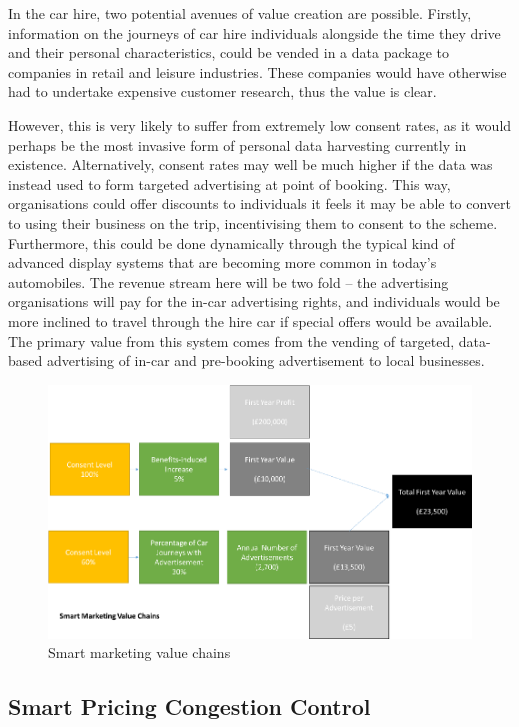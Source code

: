 \documentclass[conference]{IEEEtran}
\begin{document}
In the car hire, two potential avenues of value creation are possible.
Firstly, information on the journeys of car hire individuals alongside
the time they drive and their personal characteristics, could be
vended in a data package to companies in retail and leisure
industries. These companies would have otherwise had to undertake
expensive customer research, thus the value is clear.

However, this is very likely to suffer from extremely low consent
rates, as it would perhaps be the most invasive form of personal data
harvesting currently in existence. Alternatively, consent rates may
well be much higher if the data was instead used to form targeted
advertising at point of booking. This way, organisations could offer
discounts to individuals it feels it may be able to convert to using
their business on the trip, incentivising them to consent to the
scheme. Furthermore, this could be done dynamically through the
typical kind of advanced display systems that are becoming more common
in today’s automobiles. The revenue stream here will be two fold – the
advertising organisations will pay for the in-car advertising rights,
and individuals would be more inclined to travel through the hire car
if special offers would be available.  The primary value from this
system comes from the vending of targeted, data-based advertising of
in-car and pre-booking advertisement to local businesses.

\begin{figure}[!htp]
\centering
\includegraphics[width=\columnwidth]{images/smartmarketingvc.png}
\caption{Smart marketing value chains}
\label{fig:smartmarketingvc}
\end{figure}

\subsection{Smart Pricing Congestion Control}
\end{document}
